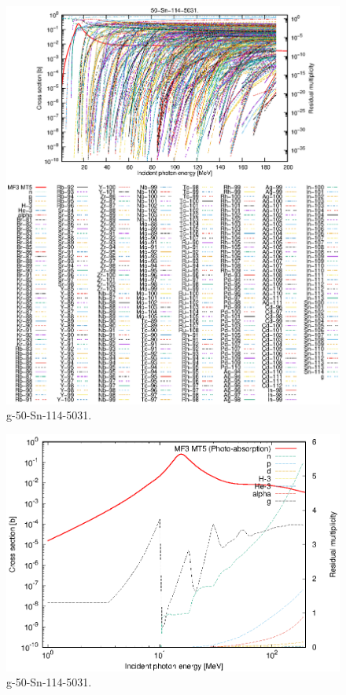 \begin{figure}
 \includegraphics[width=\linewidth]{eps/g_50-Sn-114_5031.eps}
  \caption{g-50-Sn-114-5031.}
\end{figure}
\newpage \clearpage

\begin{figure}
 \includegraphics[width=\linewidth]{eps-log/g_50-Sn-114_5031.eps}
 \caption{g-50-Sn-114-5031.}
\end{figure}
\newpage \clearpage

